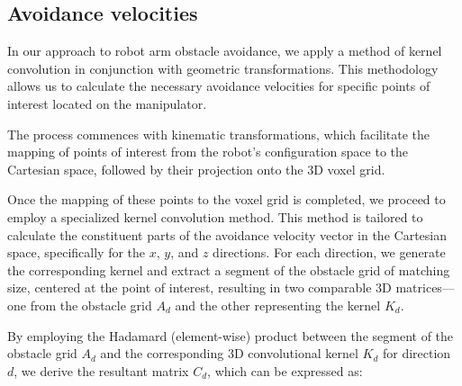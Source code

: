 \documentclass[a4paper]{article}
\newcommand\todocomment[1]{\textcolor{red}{||\\ #1\\||}}
\begin{document}


\subsection{Avoidance velocities}

In our approach to robot arm obstacle avoidance, we apply a method of kernel convolution in conjunction with geometric transformations. This methodology allows us to calculate the necessary avoidance velocities for specific points of interest located on the manipulator.

The process commences with kinematic transformations, which facilitate the mapping of points of interest from the robot's configuration space to the Cartesian space, followed by their projection onto the 3D voxel grid.


Once the mapping of these points to the voxel grid is completed, we proceed to employ a specialized kernel convolution method. This method is tailored to calculate the constituent parts of the avoidance velocity vector in the Cartesian space, specifically for the \(x\), \(y\), and \(z\) directions. For each direction, we generate the corresponding kernel and extract a segment of the obstacle grid of matching size, centered at the point of interest, resulting in two comparable 3D matrices—one from the obstacle grid $A_d$ and the other representing the kernel $K_d$.

By employing the Hadamard (element-wise) product between the segment of the obstacle grid \(A_d\) and the corresponding 3D convolutional kernel \(K_d\) for direction \(d\), we derive the resultant matrix \(C_d\), which can be expressed as:
\end{document}
